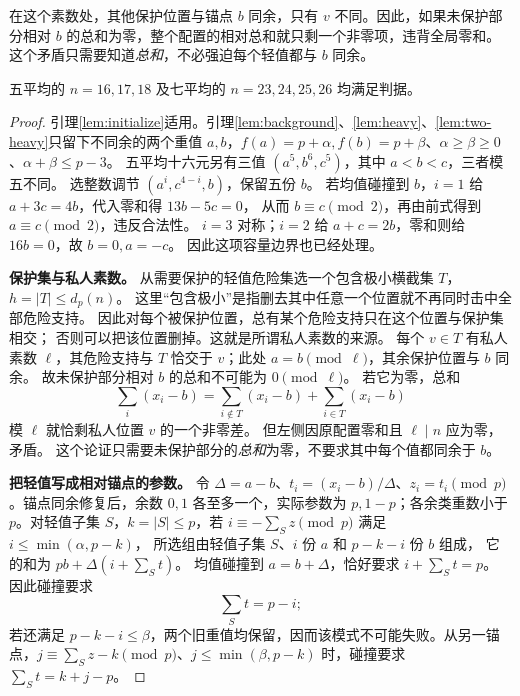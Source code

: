 在这个素数处，其他保护位置与锚点 $b$ 同余，只有 $v$ 不同。因此，如果未保护部分相对 $b$ 的总和为零，整个配置的相对总和就只剩一个非零项，违背全局零和。这个矛盾只需要知道\emph{总和}，不必强迫每个轻值都与 $b$ 同余。
\begin{lemma}[五平均和七平均的碰撞分类]\label{lem:collision-small}
五平均的 $n=16,17,18$ 及七平均的 $n=23,24,25,26$ 均满足判据。
\end{lemma}
\begin{proof}
引理\ref{lem:initialize}适用。引理\ref{lem:background}、\ref{lem:heavy}、\ref{lem:two-heavy}只留下不同余的两个重值 $a,b$，$f(a)=p+\alpha,f(b)=p+\beta$、$\alpha\ge\beta\ge0$、$\alpha+\beta\le p-3$。
五平均十六元另有三值 $(a^5,b^6,c^5)$，其中 $a<b<c$，三者模五不同。
选整数调节 $(a^i,c^{4-i},b)$，保留五份 $b$。
若均值碰撞到 $b$，$i=1$ 给 $a+3c=4b$，代入零和得 $13b-5c=0$，
从而 $b\equiv c\pmod2$，再由前式得到 $a\equiv c\pmod2$，违反合法性。
$i=3$ 对称；$i=2$ 给 $a+c=2b$，零和则给 $16b=0$，故 $b=0,a=-c$。
因此这项容量边界也已经处理。

\par\noindent\textbf{保护集与私人素数。}
从需要保护的轻值危险集选一个包含极小横截集 $T$，$h=|T|\le d_p(n)$。
这里“包含极小”是指删去其中任意一个位置就不再同时击中全部危险支持。
因此对每个被保护位置，总有某个危险支持只在这个位置与保护集相交；
否则可以把该位置删掉。这就是所谓私人素数的来源。
每个 $v\in T$ 有私人素数 $\ell$，其危险支持与 $T$ 恰交于 $v$；此处 $a=b\pmod\ell$，其余保护位置与 $b$ 同余。
故未保护部分相对 $b$ 的总和不可能为 $0\pmod\ell$。
若它为零，总和
\[
\sum_i(x_i-b)=\sum_{i\notin T}(x_i-b)+\sum_{i\in T}(x_i-b)
\]
模 $\ell$ 就恰剩私人位置 $v$ 的一个非零差。
但左侧因原配置零和且 $\ell\mid n$ 应为零，矛盾。
这个论证只需要未保护部分的\emph{总和}为零，不要求其中每个值都同余于 $b$。

\par\noindent\textbf{把轻值写成相对锚点的参数。}
令 $\Delta=a-b$、$t_i=(x_i-b)/\Delta$、$z_i=t_i\pmod p$。锚点同余修复后，余数 $0,1$ 各至多一个，实际参数为 $p,1-p$；各余类重数小于 $p$。对轻值子集 $S$，$k=|S|\le p$，若 $i\equiv-\sum_{S}z\pmod p$ 满足 $i\le\min(\alpha,p-k)$，
所选组由轻值子集 $S$、$i$ 份 $a$ 和 $p-k-i$ 份 $b$ 组成，
它的和为 $pb+\Delta(i+\sum_S t)$。
均值碰撞到 $a=b+\Delta$，恰好要求 $i+\sum_S t=p$。
因此碰撞要求
\begin{equation}\label{eq:collision}
\sum_{S}t=p-i;
\end{equation}
若还满足 $p-k-i\le\beta$，两个旧重值均保留，因而该模式不可能失败。从另一锚点，$j\equiv\sum_S z-k\pmod p$、$j\le\min(\beta,p-k)$ 时，碰撞要求 $\sum_S t=k+j-p$。


\end{proof}
